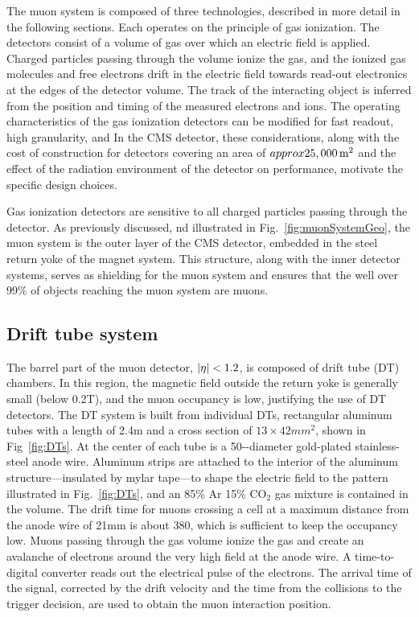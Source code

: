 The muon system is composed of three technologies, 
described in more detail in the following sections. 
Each operates on the principle of gas ionization. 
The detectors consist of a volume of 
gas over which an electric field is applied. Charged
particles passing through the volume ionize the gas, and the ionized gas molecules
and free electrons drift in the electric field towards read-out electronics at the 
edges of the detector volume. The track of the interacting object is inferred from
the position and timing of the measured electrons and ions.
The operating characteristics of the gas ionization detectors can be modified
for fast readout, high granularity, and 
In the CMS detector, these considerations, along with the cost of construction 
for detectors covering an area of $\\approx 25,000\text{\,m}^2$ and 
the effect of the radiation environment of the detector on performance, motivate
the specific design choices.

Gas ionization detectors are
sensitive to all charged particles passing through the detector. As previously discussed,
nd illustrated in Fig.~\ref{fig:muonSystemGeo}, the muon system is 
the outer layer of the CMS detector, embedded in
the steel return yoke of the magnet system. This structure, along with the inner
detector systems, serves as shielding for the muon system and ensures that the 
well over 99\% of objects reaching the muon system are muons.

\subsection{Drift tube system}

The barrel part of the muon detector, $\lvert \eta \rvert < 1.2$,
is composed of drift tube (DT) chambers. In this region, the magnetic field
outside the return yoke is generally small (below 0.2\unit{T}), and the muon occupancy is low, justifying
the use of DT detectors. The DT system is built from individual DTs, 
rectangular aluminum tubes with a length of 2.4\unit{m} and a cross section
of $13\times42\unit{mm}^2$, shown in Fig~\ref{fig:DTs}. At the center of each
tube is a 50-\micron-diameter gold-plated stainless-steel anode wire.
Aluminum strips are attached to the interior of the aluminum 
structure---insulated by mylar tape---to
shape the electric field to the pattern illustrated in Fig.~\ref{fig:DTs},
and an 85\% Ar 15\% CO$_2$ gas mixture is contained in the volume. 
The drift time for muons crossing a
cell at a maximum distance from the anode wire of 21\unit{mm}
is about 380\micron, which is sufficient to keep the occupancy low.
Muons passing through the gas volume ionize the gas and create an avalanche of
electrons around the very high field at the anode wire.
A time-to-digital converter reads out the electrical pulse of the electrons.
The arrival time of the signal, corrected by the drift velocity and the time
from the collisions to the trigger decision, are used to obtain the muon interaction
position. 

